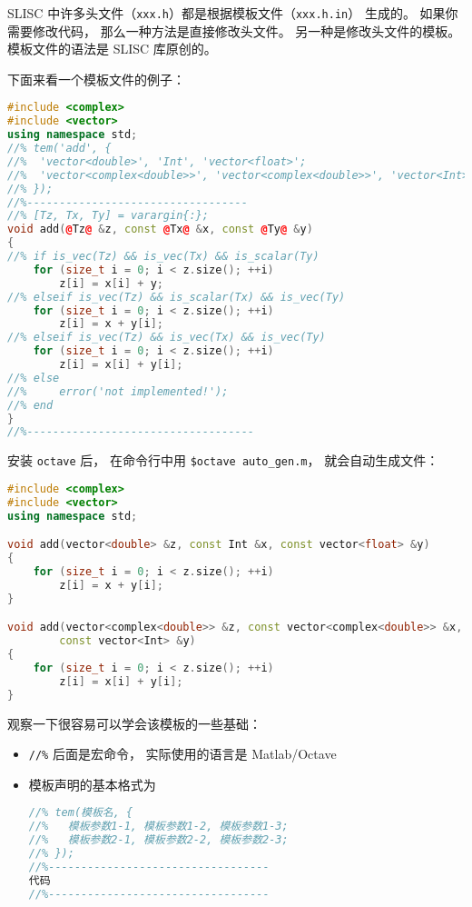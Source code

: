 
\begin{issues}
\issueDraft
\end{issues}


SLISC 中许多头文件（\verb|xxx.h|）都是根据模板文件（\verb|xxx.h.in|） 生成的。 如果你需要修改代码， 那么一种方法是直接修改头文件。 另一种是修改头文件的模板。 模板文件的语法是 SLISC 库原创的。

下面来看一个模板文件的例子：
\begin{lstlisting}[language=cpp, caption=demo.h.in]
#include <complex>
#include <vector>
using namespace std;
//% tem('add', {
//%  'vector<double>', 'Int', 'vector<float>';
//%  'vector<complex<double>>', 'vector<complex<double>>', 'vector<Int>';
//% });
//%----------------------------------
//% [Tz, Tx, Ty] = varargin{:};
void add(@Tz@ &z, const @Tx@ &x, const @Ty@ &y)
{
//% if is_vec(Tz) && is_vec(Tx) && is_scalar(Ty)
	for (size_t i = 0; i < z.size(); ++i)
		z[i] = x[i] + y;
//% elseif is_vec(Tz) && is_scalar(Tx) && is_vec(Ty)
	for (size_t i = 0; i < z.size(); ++i)
		z[i] = x + y[i];
//% elseif is_vec(Tz) && is_vec(Tx) && is_vec(Ty)
	for (size_t i = 0; i < z.size(); ++i)
		z[i] = x[i] + y[i];
//% else
//%     error('not implemented!');
//% end
}
//%-----------------------------------
\end{lstlisting}

安装 \verb|octave| 后， 在命令行中用 \verb`$octave auto_gen.m`， 就会自动生成文件：
\begin{lstlisting}[language=cpp,caption=demo.h]
#include <complex>
#include <vector>
using namespace std;

void add(vector<double> &z, const Int &x, const vector<float> &y)
{
	for (size_t i = 0; i < z.size(); ++i)
		z[i] = x + y[i];
}

void add(vector<complex<double>> &z, const vector<complex<double>> &x,
        const vector<Int> &y)
{
	for (size_t i = 0; i < z.size(); ++i)
		z[i] = x[i] + y[i];
}
\end{lstlisting}

观察一下很容易可以学会该模板的一些基础：
\begin{itemize}
\item \verb|//%| 后面是宏命令， 实际使用的语言是 Matlab/Octave
\item 模板声明的基本格式为
\begin{lstlisting}[language=cpp]
//% tem(模板名, {
//%   模板参数1-1, 模板参数1-2, 模板参数1-3;
//%   模板参数2-1, 模板参数2-2, 模板参数2-3;
//% });
//%----------------------------------
代码
//%----------------------------------
\end{lstlisting}
\end{itemize}

